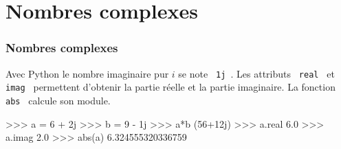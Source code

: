 \section{Nombres complexes}

\begin{frame}[fragile]
\frametitle{Nombres complexes}

Avec Python le nombre imaginaire pur $i$ se note \verb? 1j ?. Les attributs \verb? real ? et \verb? imag ? permettent d'obtenir la partie réelle et la partie imaginaire. La fonction \verb? abs ? calcule son module.

\begin{GrayBox}[0.85\textwidth]
\begin{verbatimtab}[3]
>>> a = 6 + 2j
>>> b = 9 - 1j
>>> a*b
(56+12j)
>>> a.real
6.0
>>> a.imag
2.0
>>> abs(a)
6.324555320336759
\end{verbatimtab}
\end{GrayBox}

\end{frame}


